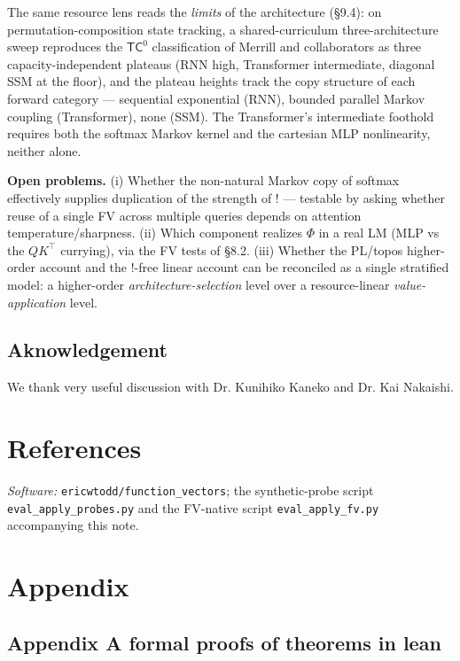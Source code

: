 \documentclass[a4paper,11pt]{article}
\begin{document}
The same resource lens reads the \emph{limits} of the architecture
(§9.4): on permutation-composition state tracking, a shared-curriculum
three-architecture sweep reproduces the \(\mathsf{TC}^0\) classification
of Merrill and collaborators as three capacity-independent plateaus (RNN
high, Transformer intermediate, diagonal SSM at the floor), and the
plateau heights track the copy structure of each forward category ---
sequential exponential (RNN), bounded parallel Markov coupling
(Transformer), none (SSM). The Transformer's intermediate foothold
requires both the softmax Markov kernel and the cartesian MLP
nonlinearity, neither alone.

\textbf{Open problems.} (i) Whether the non-natural Markov copy of
softmax effectively supplies duplication of the strength of \(!\) ---
testable by asking whether reuse of a single FV across multiple queries
depends on attention temperature/sharpness. (ii) Which component
realizes \(\Phi\) in a real LM (MLP vs the \(QK^\top\) currying), via
the FV tests of §8.2. (iii) Whether the PL/topos higher-order account
and the \(!\)-free linear account can be reconciled as a single
stratified model: a higher-order \emph{architecture-selection} level over a resource-linear \emph{value-application} level.

\hypertarget{aknowledgement}{%
\subsection{Aknowledgement}\label{aknowledgement}}

We thank very useful discussion with Dr. Kunihiko Kaneko and Dr. Kai Nakaishi.

\hypertarget{references}{%
\section{References}\label{references}}



\emph{Software:} \texttt{ericwtodd/function\_vectors}; the synthetic-probe script \texttt{eval\_apply\_probes.py} and the FV-native script \texttt{eval\_apply\_fv.py} accompanying this note.

\hypertarget{appendix}{%
\section{Appendix}\label{appendix}}

\hypertarget{appendix-a-formal-proofs-of-theorems-in-lean}{%
\subsection{Appendix A formal proofs of theorems in lean}\label{appendix-a-formal-proofs-of-theorems-in-lean}}
\end{document}

